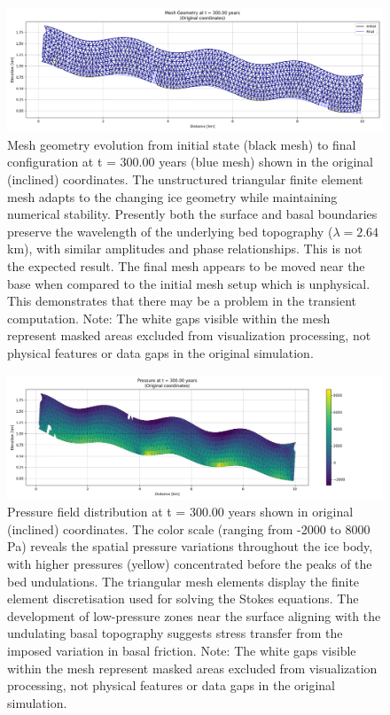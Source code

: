 \begin{figure}
    \includegraphics[scale=0.45]{overlap_xz.png}
    \caption{Mesh geometry evolution from initial state (black mesh) to final configuration at t = 300.00 years (blue mesh) shown in the original (inclined) coordinates. The unstructured triangular finite element mesh adapts to the changing ice geometry while maintaining numerical stability. Presently both the surface and basal boundaries preserve the wavelength of the underlying bed topography ($\lambda = 2.64$ km), with similar amplitudes and phase relationships. This is not the expected result. The final mesh appears to be moved near the base when compared to the initial mesh setup which is unphysical. This demonstrates that there may be a problem in the transient computation. Note: The white gaps visible within the mesh represent masked areas excluded from visualization processing, not physical features or data gaps in the original simulation.}
    \label{fig:}
\end{figure}

\begin{figure}
    \includegraphics[scale=0.45]{Pressure_300yrs_xz.png}
    \caption{Pressure field distribution at t = 300.00 years shown in original (inclined) coordinates. The color scale (ranging from -2000 to 8000 Pa) reveals the spatial pressure variations throughout the ice body, with higher pressures (yellow) concentrated before the peaks of the bed undulations. The triangular mesh elements display the finite element discretisation used for solving the Stokes equations. The development of low-pressure zones near the surface aligning with the undulating basal topography suggests stress transfer from the imposed variation in basal friction. Note: The white gaps visible within the mesh represent masked areas excluded from visualization processing, not physical features or data gaps in the original simulation.}
    \label{fig:}
\end{figure}

